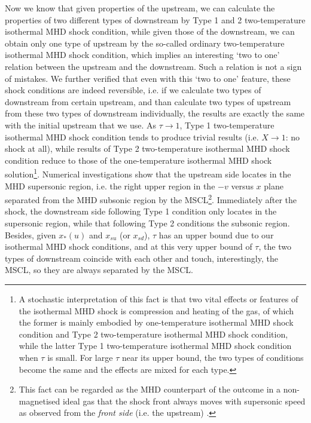 \documentclass[fleqn,usenatbib]{mnras}
\begin{document}
Now we know that given properties of the upstream, we can calculate the properties of two different types of downstream by Type 1 and 2 two-temperature isothermal MHD shock condition, while given those of the downstream, we can obtain only one type of upstream by the so-called ordinary two-temperature isothermal MHD shock condition, which implies an interesting `two to one' relation between the upstream and the downstream. Such a relation is not a sign of mistakes. We further verified that even with this `two to one' feature, these shock conditions are indeed reversible, i.e. if we calculate two types of downstream from certain upstream, and than calculate two types of upstream from these two types of downstream individually, the results are exactly the same with the initial upstream that we use. As $\tau\rightarrow 1$, Type 1 two-temperature isothermal MHD shock condition tends to produce trivial results (i.e. $X\rightarrow 1$: no shock at all), while results of Type 2 two-temperature isothermal MHD shock condition reduce to those of the one-temperature isothermal MHD shock solution\footnote{A stochastic interpretation %
of this fact is that two vital effects or features of the isothermal MHD shock is compression and heating of the gas, of which the former is mainly embodied by one-temperature isothermal MHD shock condition and Type 2 two-temperature isothermal MHD shock condition, while the latter Type 1 two-temperature isothermal MHD shock condition when $\tau$ is small. For large $\tau$ near its upper bound, the two types of conditions become the same and the effects are mixed for each type.}. Numerical investigations show that the upstream side locates in the MHD supersonic region, i.e. the right upper region in the $-v$ versus $x$ plane separated from the MHD subsonic region by the MSCL\footnote{This fact can be regarded as the MHD counterpart of the outcome in a non-magnetised ideal gas that the shock front always moves with supersonic speed as observed from the \textit{front side} (i.e. the upstream) \citep{SFSW}.}. Immediately after the shock, the downstream side following Type 1 condition only locates in the supersonic region, while that following Type 2 conditions the subsonic region. Besides, given $x_{*}(u)$ and $x_{su}$ (or $x_{sd}$), $\tau$ has an upper bound due to our isothermal MHD shock conditions, and at this very upper bound of $\tau$, the two types of downstream coincide with each other and touch, interestingly, the MSCL, so they are always separated by the MSCL.
\end{document}
